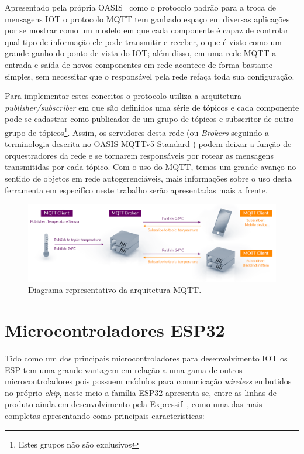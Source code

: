 Apresentado pela própria OASIS\textregistered~ como o protocolo padrão para a troca de mensagens \ac{IOT} o protocolo \ac{MQTT}
tem ganhado espaço em diversas aplicações por se mostrar como um modelo em que cada componente é capaz de controlar qual
tipo de informação ele pode transmitir e receber, o que é visto como um grande ganho do ponto de vista do \ac{IOT}; além 
disso, em uma rede \ac{MQTT} a entrada e saída de novos componentes em rede acontece de forma bastante simples, sem 
necessitar que o responsável pela rede refaça toda sua configuração.

Para implementar estes conceitos o protocolo utiliza a arquitetura \textit{publisher/subscriber} em que são definidos
uma série de tópicos e cada componente pode se cadastrar como publicador de um grupo de tópicos e subscritor de outro 
grupo de tópicos\footnote{Estes grupos não são exclusivos}. Assim, os servidores desta rede (ou \textit{Brokers} seguindo a terminologia
descrita no OASIS MQTTv5 Standard \cite{mqtt-std}) podem deixar a função de orquestradores da rede e se tornarem responsáveis
por rotear as mensagens transmitidas por cada tópico. Com o uso do \ac{MQTT}, temos um grande avanço no sentido de objetos
em rede autogerenciáveis, mais informações sobre o uso desta ferramenta em especifíco neste trabalho serão apresentadas 
mais a frente.

\begin{figure}[htb]
    \begin{center}
	    \includegraphics[scale=0.3]{figs/mqtt-publish-subscribe.png}
	\end{center}
	\caption{Diagrama representativo da arquitetura \ac{MQTT}.} 
\end{figure}

\section{Microcontroladores ESP32}

Tido como um dos principais microcontroladores para desenvolvimento \ac{IOT} os ESP tem uma grande vantagem em relação 
a uma gama de outros microcontroladores pois possuem módulos para comunicação \textit{wireless} embutidos no próprio
\textit{chip}, neste meio a família ESP32 apresenta-se, entre as linhas de produto ainda em desenvolvimento pela 
Expressif\textregistered~, como uma das mais completas apresentando como principais características:

